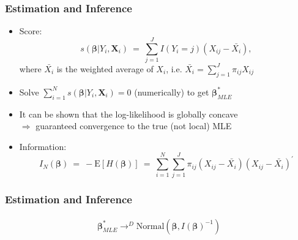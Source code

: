 \documentclass{beamer}
\begin{document}
\begin{frame}
\frametitle{Estimation and Inference}
\begin{itemize}
  \item Score:
    $$  \textstyle s(\boldsymbol{\beta}| Y_{i}, \boldsymbol{X}_{i}) \ = \  \sum_{j=1}^J I(Y_{i}=j)
    \left(X_{ij} - \bar{X_i} \right), $$
    where $\bar{X_i}$ is the weighted average of $X_i$,
    i.e. $\bar{X_i} = \sum_{j=1}^J \pi_{ij}X_{ij}$
\pause
  \item Solve $\sum_{i=1}^{N} s(\boldsymbol{\beta}| Y_{i}, \boldsymbol{X}_{i}) = 0$ (numerically) to get $\boldsymbol{\beta}_{MLE}^{*}$
  \item It can be shown that the log-likelihood is globally concave \\
    $\Rightarrow$ guaranteed convergence to the true (not local) MLE
\medskip

\pause
  \item Information:
    $$ \textstyle I_{N} (\boldsymbol{\beta}) \ = \ -\text{E}[H(\boldsymbol{\beta})] \ = \
    \sum_{i=1}^N \sum_{j=1}^J \pi_{ij}
    \left(X_{ij} - \bar{X_i} \right)\left(X_{ij} - \bar{X_i} \right)^{'} $$

\end{itemize}

\end{frame}

\begin{frame}
\frametitle{Estimation and Inference}
\begin{eqnarray}
\boldsymbol{\beta}^{*}_{MLE} \longrightarrow^{D}
    \text{Normal}\left(\boldsymbol{\beta}, I(\boldsymbol{\beta})^{-1}\right) \nonumber
    \end{eqnarray}




\end{frame}
\end{document}
